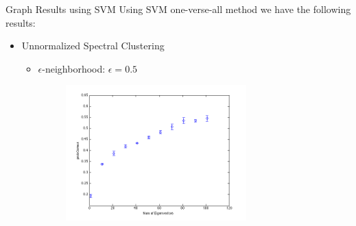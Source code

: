 \documentclass[xcolor=dvipsnames,t]{beamer} %
\begin{document}
\begin{frame}{Graph Results using SVM}
Using SVM one-verse-all method we have the following results: 
\begin{itemize}
\item Unnormalized Spectral Clustering 
\begin{itemize}
\item $\epsilon$-neighborhood: $\epsilon = 0.5$
\begin{figure}[h!]
\centering
  \centering
    \includegraphics[width=0.7\textwidth]{figures/plotopt1e5.png}
\end{figure}
\end{itemize}
\end{itemize}

\end{frame}
\end{document}
